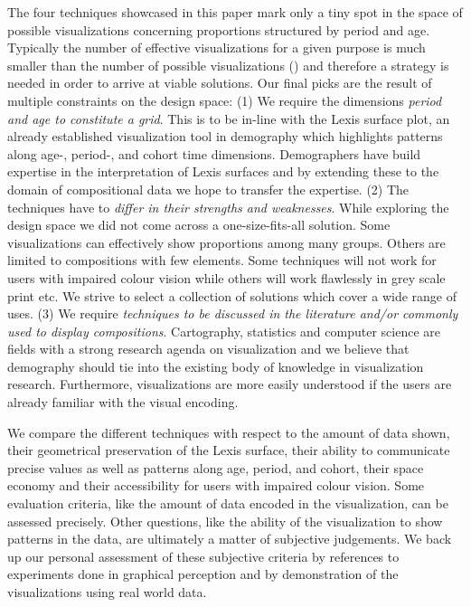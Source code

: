 \documentclass[parskip=half]{scrartcl}
\begin{document}
The four techniques showcased in this paper mark only a tiny spot in the space of possible visualizations concerning proportions structured by period and age. Typically the number of effective visualizations for a given purpose is much smaller than the number of possible visualizations (\cite{Munzner2015}) and therefore a strategy is needed in order to arrive at viable solutions. Our final picks are the result of multiple constraints on the design space:
  (1) We require the dimensions \emph{period and age to constitute a grid}. This is to be in-line with the Lexis surface plot, an already established visualization tool in demography which highlights patterns along age-, period-, and cohort time dimensions. Demographers have build expertise in the interpretation of Lexis surfaces and by extending these to the domain of compositional data we hope to transfer the expertise.
  (2) The techniques have to \emph{differ in their strengths and weaknesses}. While exploring the design space we did not come across a one-size-fits-all solution. Some visualizations can effectively show proportions among many groups. Others are limited to compositions with few elements. Some techniques will not work for users with impaired colour vision while others will work flawlessly in grey scale print etc. We strive to select a collection of solutions which cover a wide range of uses.
  (3) We require \emph{techniques to be discussed in the literature and/or commonly used to display compositions}. Cartography, statistics and computer science are fields with a strong research agenda on visualization and we believe that demography should tie into the existing body of knowledge in visualization research. Furthermore, visualizations are more easily understood if the users are already familiar with the visual encoding.

We compare the different techniques with respect to the amount of data shown, their geometrical preservation of the Lexis surface, their ability to communicate precise values as well as patterns along age, period, and cohort, their space economy and their accessibility for users with impaired colour vision. Some evaluation criteria, like the amount of data encoded in the visualization, can be assessed precisely. Other questions, like the ability of the visualization to show patterns in the data, are ultimately a matter of subjective judgements. We back up our personal assessment of these subjective criteria by references to experiments done in graphical perception and by demonstration of the visualizations using real world data.
\end{document}
